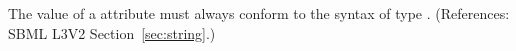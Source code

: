 The value of a  attribute must always conform to the syntax
of type .  (References: SBML L3V2 Section~\ref{sec:string}.)
